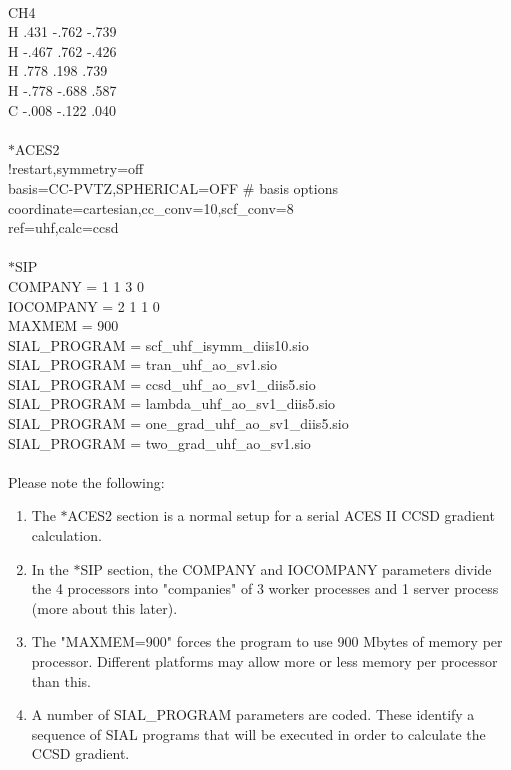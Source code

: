 \documentclass[12pt]{article}
\begin{document}
\\
CH4\\ 
H    .431     -.762     -.739\\ 
H   -.467      .762     -.426\\ 
H    .778      .198      .739\\ 
H   -.778     -.688      .587\\ 
C   -.008     -.122      .040\\ 
\\
$*$ACES2\\ 
!restart,symmetry=off\\ 
basis=CC-PVTZ,SPHERICAL=OFF \# basis options\\ 
coordinate=cartesian,cc\_conv=10,scf\_conv=8\\ 
ref=uhf,calc=ccsd\\ 
\\ 
$*$SIP\\ 
COMPANY   = 1 1 3 0\\ 
IOCOMPANY = 2 1 1 0\\ 
MAXMEM    = 900\\ 
SIAL\_PROGRAM = scf\_uhf\_isymm\_diis10.sio\\ 
SIAL\_PROGRAM = tran\_uhf\_ao\_sv1.sio\\ 
SIAL\_PROGRAM = ccsd\_uhf\_ao\_sv1\_diis5.sio\\ 
SIAL\_PROGRAM = lambda\_uhf\_ao\_sv1\_diis5.sio\\ 
SIAL\_PROGRAM = one\_grad\_uhf\_ao\_sv1\_diis5.sio\\ 
SIAL\_PROGRAM = two\_grad\_uhf\_ao\_sv1.sio\\ 
\\
Please note the following: 

\begin{enumerate} 

\item The $*$ACES2 section is a normal setup for a serial ACES II CCSD gradient calculation.

\item In the $*$SIP section, the COMPANY and IOCOMPANY parameters divide the 4 processors 
         into "companies" of 3 worker processes and 1 server process (more about this later).

\item The "MAXMEM=900" forces the program to use 900 Mbytes of memory per processor. 
         Different platforms may allow more or less memory per processor than this.

\item A number of SIAL\_PROGRAM parameters are coded.  These identify a sequence of 
         SIAL programs that will be executed in order to calculate the CCSD gradient.  

\end{enumerate} 
\end{document}
